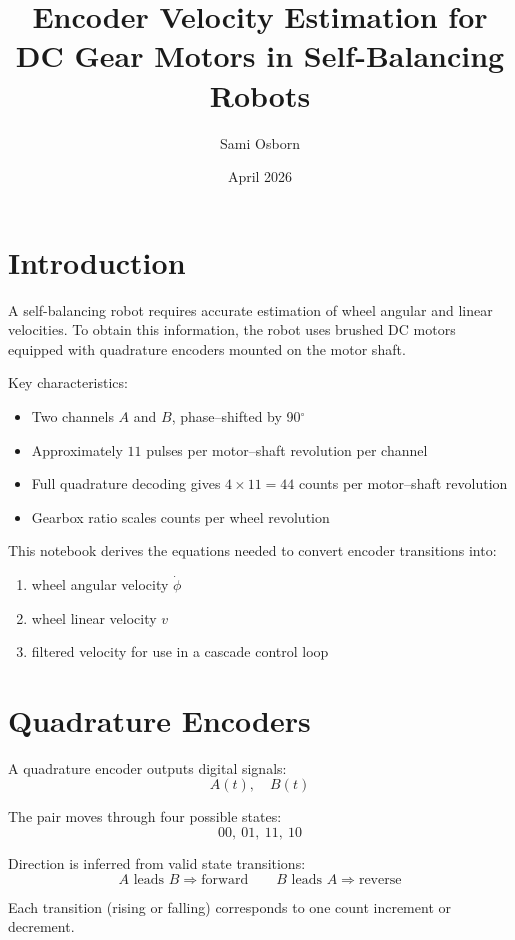 \documentclass[11pt,a4paper]{article}
\author{Sami Osborn}
\title{Encoder Velocity Estimation for DC Gear Motors in Self-Balancing Robots}
\date{April 2026}
\begin{document}
\maketitle

\section{Introduction}

A self-balancing robot requires accurate estimation of wheel angular and linear velocities.  
To obtain this information, the robot uses brushed DC motors equipped with quadrature encoders mounted on the motor shaft.  

Key characteristics:
\begin{itemize}
    \item Two channels \( A \) and \( B \), phase--shifted by 90\(^\circ\)
    \item Approximately \( 11 \) pulses per motor--shaft revolution per channel
    \item Full quadrature decoding gives \( 4 \times 11 = 44 \) counts per motor--shaft revolution
    \item Gearbox ratio scales counts per wheel revolution
\end{itemize}

This notebook derives the equations needed to convert encoder transitions into:
\begin{enumerate}
    \item wheel angular velocity \( \dot{\phi} \)
    \item wheel linear velocity \( v \)
    \item filtered velocity for use in a cascade control loop
\end{enumerate}

\section{Quadrature Encoders}

A quadrature encoder outputs digital signals:
\[
A(t),\quad B(t)
\]

The pair moves through four possible states:
\[
00,\ 01,\ 11,\ 10
\]

Direction is inferred from valid state transitions:
\[
A \text{ leads } B \Rightarrow \text{forward} \qquad
B \text{ leads } A \Rightarrow \text{reverse}
\]

Each transition (rising or falling) corresponds to one count increment or decrement.
\end{document}
